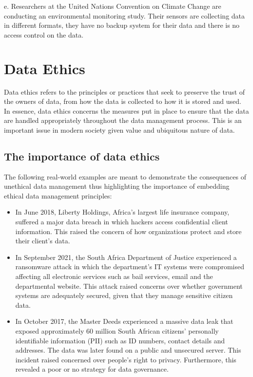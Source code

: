 \documentclass[
]{book}
\begin{document}
e. Researchers at the United Nations Convention on Climate Change are conducting an environmental monitoring study. Their sensors are collecting data in different formats, they have no backup system for their data and there is no access control on the data.

\newpage

\section{Data Ethics}\label{sec1-4}

Data ethics refers to the principles or practices that seek to preserve the trust of the owners of data, from how the data is collected to how it is stored and used. In essence, data ethics concerns the measures put in place to ensure that the data are handled appropriately throughout the data management process. This is an important issue in modern society given value and ubiquitous nature of data.

\subsection{The importance of data ethics}\label{the-importance-of-data-ethics}

The following real-world examples are meant to demonstrate the consequences of unethical data management thus highlighting the importance of embedding ethical data management principles:

\begin{itemize}
\item
  In June 2018, Liberty Holdings, Africa's largest life insurance company, suffered a major data breach in which hackers access confidential client information. This raised the concern of how organizations protect and store their client's data.
\item
  In September 2021, the South Africa Department of Justice experienced a ransomware attack in which the department's IT systems were compromised affecting all electronic services such as bail services, email and the departmental website. This attack raised concerns over whether government systems are adequately secured, given that they manage sensitive citizen data.
\item
  In October 2017, the Master Deeds experienced a massive data leak that exposed approximately 60 million South African citizens' personally identifiable information (PII) such as ID numbers, contact details and addresses. The data was later found on a public and unsecured server. This incident raised concerned over people's right to privacy. Furthermore, this revealed a poor or no strategy for data governance.
\end{itemize}
\end{document}

